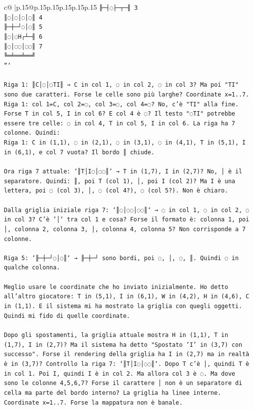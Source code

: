 \documentclass{article}
\begin{document}
{\begin{supertabular}{c@{$\;$}|p{.15\linewidth}@{}p{.15\linewidth}p{.15\linewidth}p{.15\linewidth}p{.15\linewidth}p{.15\linewidth}}
{{{\texttt{╟─┤◌├─┬─╢ 3} \\
\texttt{║◌│◌│◌│◌║ 4} \\
\texttt{╟─┼─┘◌│◌║ 5} \\
\texttt{║◌│◌H┌┴─╢ 6} \\
\texttt{║◌│◌◌│◌◌║ 7} \\
\texttt{╚═╧══╧══╝} \\
\texttt{```} \\
\\ 
\texttt{Riga 1: ║C│◌│◌TI║ → C in col 1, ◌ in col 2, ◌ in col 3? Ma poi "TI" sono due caratteri. Forse le celle sono più larghe? Coordinate x=1..7. Riga 1: col 1=C, col 2=◌, col 3=◌, col 4=◌? No, c'è "TI" alla fine. Forse T in col 5, I in col 6? E col 4 è ◌? Il testo "◌TI" potrebbe essere tre celle: ◌ in col 4, T in col 5, I in col 6. La riga ha 7 colonne. Quindi:} \\
\texttt{Riga 1: C in (1,1), ◌ in (2,1), ◌ in (3,1), ◌ in (4,1), T in (5,1), I in (6,1), e col 7 vuota? Il bordo ║ chiude.} \\
\\ 
\texttt{Ora riga 7 attuale: `║T│I◌│◌◌║` → T in (1,7), I in (2,7)? No, │ è il separatore. Quindi: ║, poi T (col 1), │, poi I (col 2)? Ma I è una lettera, poi ◌ (col 3), │, ◌ (col 4?), ◌ (col 5?). Non è chiaro.} \\
\\ 
\texttt{Dalla griglia iniziale riga 7: `║◌│◌◌│◌◌║` → ◌ in col 1, ◌ in col 2, ◌ in col 3? C'è `│` tra col 1 e cosa? Forse il formato è: colonna 1, poi │, colonna 2, colonna 3, │, colonna 4, colonna 5? Non corrisponde a 7 colonne.} \\
\\ 
\texttt{Riga 5: `╟─┼─┘◌│◌║` → ╟─┼─┘ sono bordi, poi ◌, │, ◌, ║. Quindi ◌ in qualche colonna.} \\
\\ 
\texttt{Meglio usare le coordinate che ho inviato inizialmente. Ho detto all'altro giocatore: T in (5,1), I in (6,1), W in (4,2), H in (4,6), C in (1,1). E il sistema mi ha mostrato la griglia con quegli oggetti. Quindi mi fido di quelle coordinate.} \\
\\ 
\texttt{Dopo gli spostamenti, la griglia attuale mostra H in (1,1), T in (1,7), I in (2,7)? Ma il sistema ha detto "Spostato 'I' in (3,7) con successo". Forse il rendering della griglia ha I in (2,7) ma in realtà è in (3,7)? Controllo la riga 7: `║T│I◌│◌◌║`. Dopo T c'è │, quindi T è in col 1. Poi I, quindi I è in col 2. Ma allora col 3 è ◌. Ma dove sono le colonne 4,5,6,7? Forse il carattere │ non è un separatore di cella ma parte del bordo interno? La griglia ha linee interne. Coordinate x=1..7. Forse la mappatura non è banale. } \\
}}}
\end{supertabular}}
\end{document}

